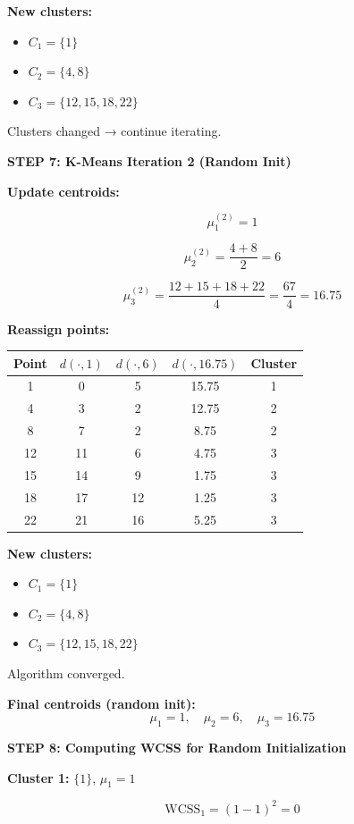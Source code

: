 \documentclass[12pt]{article}
\begin{document}
\begin{solution}
\textbf{New clusters:}
\begin{itemize}
    \item $C_1 = \{1\}$
    \item $C_2 = \{4, 8\}$
    \item $C_3 = \{12, 15, 18, 22\}$
\end{itemize}

Clusters changed → continue iterating.

\textbf{STEP 7: K-Means Iteration 2 (Random Init)}

\textbf{Update centroids:}

\[
\mu_1^{(2)} = 1
\]

\[
\mu_2^{(2)} = \frac{4 + 8}{2} = 6
\]

\[
\mu_3^{(2)} = \frac{12 + 15 + 18 + 22}{4} = \frac{67}{4} = 16.75
\]

\textbf{Reassign points:}

\begin{center}
\begin{tabular}{c|c|c|c|c}
Point & $d(\cdot, 1)$ & $d(\cdot, 6)$ & $d(\cdot, 16.75)$ & Cluster \\
\hline
1 & 0 & 5 & 15.75 & 1 \\
4 & 3 & 2 & 12.75 & 2 \\
8 & 7 & 2 & 8.75 & 2 \\
12 & 11 & 6 & 4.75 & 3 \\
15 & 14 & 9 & 1.75 & 3 \\
18 & 17 & 12 & 1.25 & 3 \\
22 & 21 & 16 & 5.25 & 3 \\
\end{tabular}
\end{center}

\textbf{New clusters:}
\begin{itemize}
    \item $C_1 = \{1\}$
    \item $C_2 = \{4, 8\}$
    \item $C_3 = \{12, 15, 18, 22\}$
\end{itemize}

Algorithm converged.

\textbf{Final centroids (random init):}
\[
\boxed{\mu_1 = 1, \quad \mu_2 = 6, \quad \mu_3 = 16.75}
\]

\textbf{STEP 8: Computing WCSS for Random Initialization}

\textbf{Cluster 1:} $\{1\}$, $\mu_1 = 1$

\[
\text{WCSS}_1 = (1 - 1)^2 = 0
\]


\end{solution}
\end{document}
